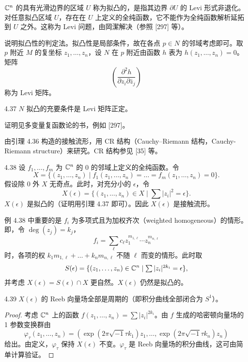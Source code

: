 $\mathbb{C}^n$ 的具有光滑边界的区域 $U$ 称为拟凸的，是指其边界 $\partial U$ 的 Levi 形式非退化。对任意拟凸区域 $U$，存在在 $U$ 上定义的全纯函数，它不能作为全纯函数解析延拓到 $U$ 之外。这称为 Levi 问题，由岡潔解决（参照 [297] 等）。

说明拟凸性的判定法。拟凸性是局部条件，故在各点 $p\in N$ 的邻域考虑即可。取 $p$ 附近 $M$ 的复坐标 $z_1,\dots,z_n$，设 $N$ 在 $p$ 附近由函数 $h$ 表为 $h(z_1,\dots,z_n)=0$。矩阵
\[
  \left(\frac{\partial^2h}{\partial z_i\partial\bar z_j}\right)
\]
称为 Levi 矩阵。

\begin{lemma}{4.37}
  $N$ 拟凸的充要条件是 Levi 矩阵正定。
\end{lemma}

证明见多变量复函数论的书，例如 [297]。

由引理 4.36 构造的接触流形，用 CR 结构（Cauchy–Riemann 结构，Cauchy-Riemann structure）来研究。CR 结构参见 [35] 等。

\begin{example}{4.38}
  设 $f_1,\dots,f_m$ 为 $\mathbb{C}^n$ 的 $0$ 的邻域上定义的全纯函数。令
  \[
    X=\{(z_1,\dots,z_n)\mid f_1(z_1,\dots,z_n)=\dots=f_m(z_1,\dots,z_n)=0\}.
  \]
  假设除 $0$ 外 $X$ 无奇点。此时，对充分小的 $\epsilon$，令
  \[
    X(\epsilon)=\{(z_1,\dots,z_n)\in X\mid \textstyle\sum|z_i|^2=\epsilon\}.
  \]
  $X(\epsilon)$ 是拟凸的（证明用引理 4.37 即可）。因此 $X(\epsilon)$ 是接触流形。
\end{example}

例 4.38 中重要的是 $f_i$ 为多项式且为加权齐次（weighted homogeneous）的情形。即，令 $\deg(z_j)=k_j$，
\[
  f_i=\sum_\ell c_\ell z_1^{m_{1,\ell}}\cdots z_n^{m_{n,\ell}}
\]
时，各项的权 $k_1m_{1,\ell}+\dots+k_nm_{n,\ell}$ 不随 $\ell$ 而变的情形。此时取
\[
  S(\epsilon)=\{(z_1,\dots,z_n)\in\mathbb{C}^n\mid \textstyle\sum|z_i|^{2k_i}=\epsilon\},
\]
并考虑 $X(\epsilon)=S(\epsilon)\cap X$ 更自然。$X(\epsilon)$ 仍然是拟凸的。

\begin{lemma*}{4.39}
  $X(\epsilon)$ 的 Reeb 向量场全部是周期的（即积分曲线全部闭合为 $S^1$）。
\end{lemma*}
\begin{proof}
  考虑 $\mathbb{C}^n$ 上的函数 $f(z_1,\dots,z_n)=\sum|z_i|^{2k_i}$。由 $f$ 生成的哈密顿向量场的 1 参数变换群由
  \[
    \varphi_\tau(z_1,\dots,z_n)=(\exp(2\pi\sqrt{-1}\tau k_1)z_1,\dots,\exp(2\pi\sqrt{-1}\tau k_n)z_n)
  \]
  给出。由定义，$\varphi_\tau$ 保持 $X(\epsilon)$ 不变。$\varphi_\tau$ 是 Reeb 向量场的积分曲线，这可由简单计算验证。
\end{proof}

